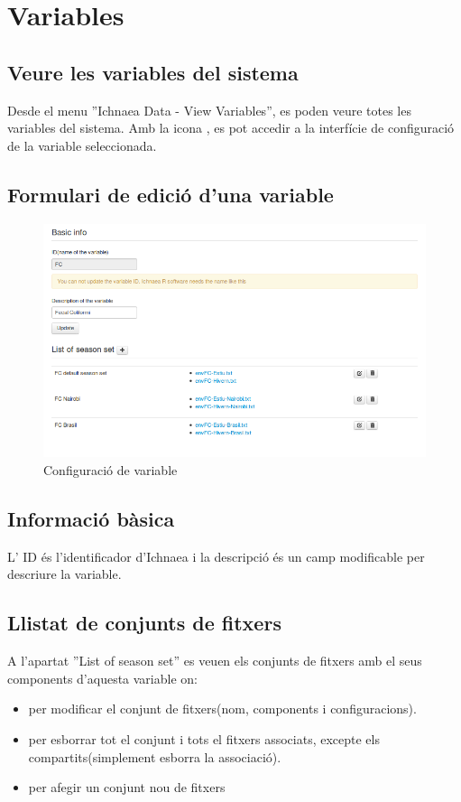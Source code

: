 \section{Variables}
\subsection{Veure les variables del sistema}
Desde el menu ''Ichnaea  Data - View Variables'', es poden veure totes les variables del sistema. Amb la icona \iconeyeopen, es pot accedir a la interfície de configuraci\'{o} de la variable seleccionada.

\subsection{Formulari de edici\'{o} d'una variable}
\begin{figure}[h!]
  \centering
  \includegraphics[scale=0.5]{img/userguide/variable_configuration.png}
  \caption{Configuraci\'{o} de variable}
  \label{fig:placement}
\end{figure}
\subsection*{Informació bàsica}
L' ID \'{e}s l'identificador d'Ichnaea i la descripció \'{e}s un camp modificable per descriure la variable.
\subsection{Llistat de conjunts de fitxers}
A l'apartat ''List of season set'' es veuen els conjunts de fitxers amb el seus components d'aquesta variable on:
\begin{itemize}
\item \iconedit per modificar el conjunt de fitxers(nom, components i configuracions).
\item \icontrash per esborrar tot el conjunt i tots el fitxers associats, excepte els compartits(simplement esborra la associació).
\item \iconadd per afegir un conjunt nou de fitxers
\end{itemize}

